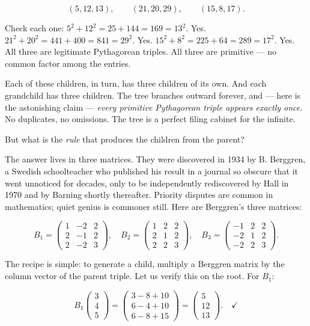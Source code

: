 \[(5, 12, 13), \qquad (21, 20, 29), \qquad (15, 8, 17).\]

Check each one: $5^2 + 12^2 = 25 + 144 = 169 = 13^2$. Yes. $21^2 + 20^2 = 441 + 400 = 841 = 29^2$. Yes. $15^2 + 8^2 = 225 + 64 = 289 = 17^2$. Yes. All three are legitimate Pythagorean triples. All three are primitive --- no common factor among the entries.

Each of these children, in turn, has three children of its own. And each grandchild has three children. The tree branches outward forever, and --- here is the astonishing claim --- \textit{every primitive Pythagorean triple appears exactly once}. No duplicates, no omissions. The tree is a perfect filing cabinet for the infinite.

But what is the \textit{rule} that produces the children from the parent?

The answer lives in three matrices. They were discovered in 1934 by B. Berggren, a Swedish schoolteacher who published his result in a journal so obscure that it went unnoticed for decades, only to be independently rediscovered by Hall in 1970 and by Barning shortly thereafter. Priority disputes are common in mathematics; quiet genius is commoner still. Here are Berggren's three matrices:

\[B_1 = \begin{pmatrix} 1 & -2 & 2 \\ 2 & -1 & 2 \\ 2 & -2 & 3 \end{pmatrix}, \quad B_2 = \begin{pmatrix} 1 & 2 & 2 \\ 2 & 1 & 2 \\ 2 & 2 & 3 \end{pmatrix}, \quad B_3 = \begin{pmatrix} -1 & 2 & 2 \\ -2 & 1 & 2 \\ -2 & 2 & 3 \end{pmatrix}.\]

The recipe is simple: to generate a child, multiply a Berggren matrix by the column vector of the parent triple. Let us verify this on the root. For $B_1$:

\[B_1 \begin{pmatrix} 3 \\ 4 \\ 5 \end{pmatrix} = \begin{pmatrix} 3 - 8 + 10 \\ 6 - 4 + 10 \\ 6 - 8 + 15 \end{pmatrix} = \begin{pmatrix} 5 \\ 12 \\ 13 \end{pmatrix}. \quad \checkmark\]

